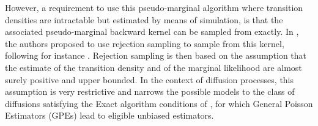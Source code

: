 \documentclass{article}
\begin{document}
  


However, a requirement to use this pseudo-marginal algorithm where transition densities are intractable but  estimated by means of simulation, is that the associated pseudo-marginal backward kernel can be sampled from exactly. In  \cite{gloaguen2021pseudo}, the authors proposed to use rejection sampling to sample from this kernel, following for instance \cite{gloaguen2018online}. Rejection sampling is then based on the assumption that the estimate of the transition density and of the marginal likelihood  are almost surely positive and upper bounded.  
In the context of diffusion processes, this assumption is very restrictive and narrows the possible models to the class of diffusions satisfying the Exact algorithm conditions of \cite{beskos2006retrospective}, for which  General Poisson Estimators (GPEs) \cite{fearnhead2008particle} lead to eligible unbiased estimators.  
\end{document}

